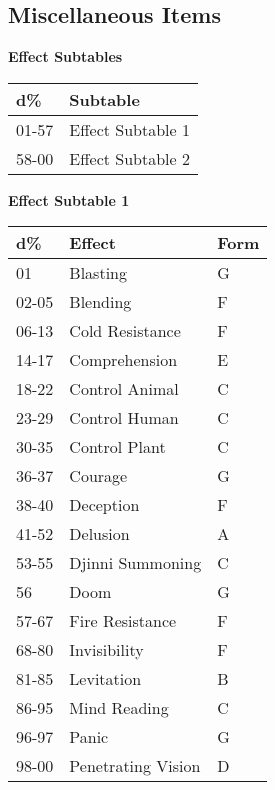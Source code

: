 \documentclass[a4paper,twoside,openany,10pt]{book}
\begin{document}
 \begin{multicols}{2}
 	
\subsection{Miscellaneous Items}\label{miscellaneous-items}

\textbf{Effect Subtables}\medskip

\begin{tabular*}{0.93\linewidth}{@{\extracolsep{\fill}}ll}
\textbf{d\%} & \textbf{Subtable} \\\toprule
01-57 & Effect Subtable 1 \\\hline
58-00 & Effect Subtable 2 \\\bottomrule
\end{tabular*}\medskip

\textbf{Effect Subtable 1}\medskip

\begin{tabular*}{0.93\linewidth}{@{\extracolsep{\fill}}lll}
\textbf{d\%} & \textbf{Effect} & \textbf{Form} \\\toprule
01 & Blasting & G \\\hline
02-05 & Blending & F \\\hline
06-13 & Cold Resistance & F \\\hline
14-17 & Comprehension & E \\\hline
18-22 & Control Animal & C \\\hline
23-29 & Control Human & C \\\hline
30-35 & Control Plant & C \\\hline
36-37 & Courage & G \\\hline
38-40 & Deception & F \\\hline
41-52 & Delusion & A \\\hline
53-55 & Djinni Summoning & C \\\hline
56 & Doom & G \\\hline
57-67 & Fire Resistance & F \\\hline
68-80 & Invisibility & F \\\hline
81-85 & Levitation & B \\\hline
86-95 & Mind Reading & C \\\hline
96-97 & Panic & G \\\hline
98-00 & Penetrating Vision & D \\\bottomrule
\end{tabular*}\medskip


\end{multicols}
\end{document}
